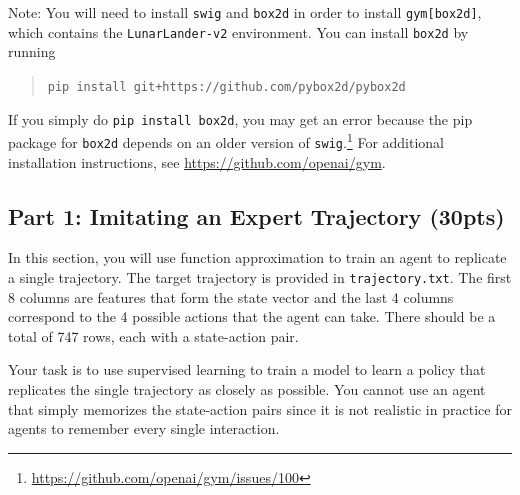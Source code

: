 \documentclass[12pt]{article}
\begin{document}
Note: You will need to install \texttt{swig} and \texttt{box2d} in order to install \texttt{gym[box2d]}, which contains the \texttt{LunarLander-v2} environment. You can install \texttt{box2d} by running
\begin{quote}
\texttt{pip install git+https://github.com/pybox2d/pybox2d}
\end{quote}
If you simply do \texttt{pip install box2d}, you may get an error because the pip package for \texttt{box2d} depends on an older version of \texttt{swig}.\footnote{\url{https://github.com/openai/gym/issues/100}} For additional installation instructions, see \url{https://github.com/openai/gym}.

\newpage
\subsection*{Part 1: Imitating an Expert Trajectory (30pts)}
In this section, you will use function approximation to train an agent to replicate a single trajectory.  The target trajectory is provided in \texttt{trajectory.txt}.  The first 8 columns are features that form the state vector and the last 4 columns correspond to the 4 possible actions that
the agent can take.  There should be a total of 747 rows, each with a state-action pair.  

Your task is to use supervised learning to train a model to learn a policy that replicates the single trajectory as closely as possible.  You cannot use an agent that simply memorizes the state-action pairs since it is not realistic in practice for agents to remember every single interaction.  
\end{document}
